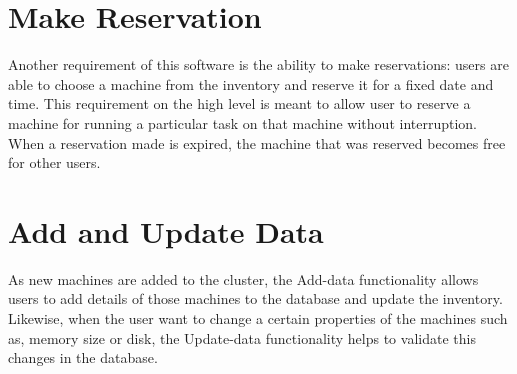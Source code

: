 \section*{Make Reservation}
Another requirement of this software is the ability to make reservations: users are able to choose a machine from the inventory and reserve it for a fixed date and time. This requirement on the high level is meant to allow user to reserve a machine for running a particular task on that machine without interruption. When a reservation made is expired, the machine that was reserved becomes free for other users. 
\section*{Add and Update Data} \label{addmachines}
As new machines are added to the cluster, the Add-data functionality allows users to add details of those machines to the database and update the inventory. Likewise, when the user want to change a certain properties of the machines such as, memory size or disk, the Update-data functionality helps to validate  this changes in the database.

